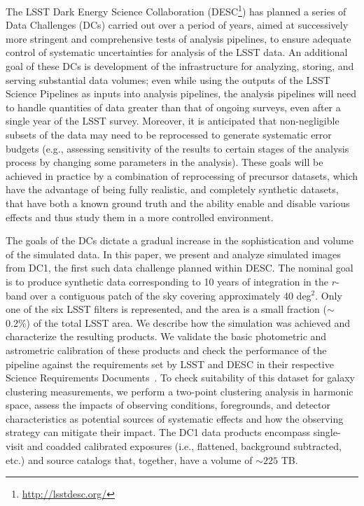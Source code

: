 \documentclass[\docopts]{\docclass}
\begin{document}
The LSST Dark Energy Science Collaboration
(DESC\footnote{\url{http://lsstdesc.org/}}) has planned a series of
Data Challenges (DCs) carried out over a period of years, aimed at
successively more stringent and comprehensive tests of analysis
pipelines, to ensure adequate control of systematic uncertainties for
analysis of the LSST data.  An additional goal of these DCs is
development of the infrastructure for analyzing, storing, and serving
substantial data volumes; even while using the outputs of the LSST
Science Pipelines as inputs into analysis pipelines, the
analysis pipelines will need to handle quantities of data greater than that of 
ongoing surveys, even after a single year of the LSST survey. 
Moreover, it is anticipated that non-negligible subsets of
the data may need to be reprocessed to generate systematic error
budgets (e.g., assessing sensitivity of the results to certain stages
of the analysis process by changing some parameters in the
analysis). These goals will be achieved in practice by a combination
of reprocessing of precursor datasets, which have the advantage of
being fully realistic, and completely synthetic datasets, that have both a known ground 
truth and the ability enable and disable various effects and thus study them in a more controlled environment.

The goals of the DCs dictate a gradual increase in the
sophistication and volume of the simulated data. In this paper, we
present and analyze simulated images from DC1, the first such
data challenge planned within DESC. The nominal goal 
is to produce synthetic data corresponding to 10 years of integration
in the $r$-band over a contiguous patch of the sky covering approximately 40 deg$^{2}$. 
Only one of the six LSST filters is represented, and the area is 
a small fraction ($\sim$ 0.2\%) of the total LSST area. We
describe how the simulation was achieved and characterize the resulting
products. We validate the basic photometric and astrometric
calibration of these products and check the performance of the
pipeline against the requirements set by LSST and DESC in their
respective Science Requirements Documents~\citep{LPM-17,
  2018arXiv180901669T}. To check suitability of this dataset for galaxy clustering
measurements, we perform a two-point clustering analysis in harmonic space, 
assess the impacts of observing conditions, foregrounds, and detector characteristics as potential sources 
of systematic effects and how the observing strategy can mitigate their impact. The DC1 data products encompass single-visit and coadded calibrated exposures (i.e., flattened, background subtracted,
etc.) and source catalogs that, together, have a volume of $\sim 225$ TB.
\end{document}
